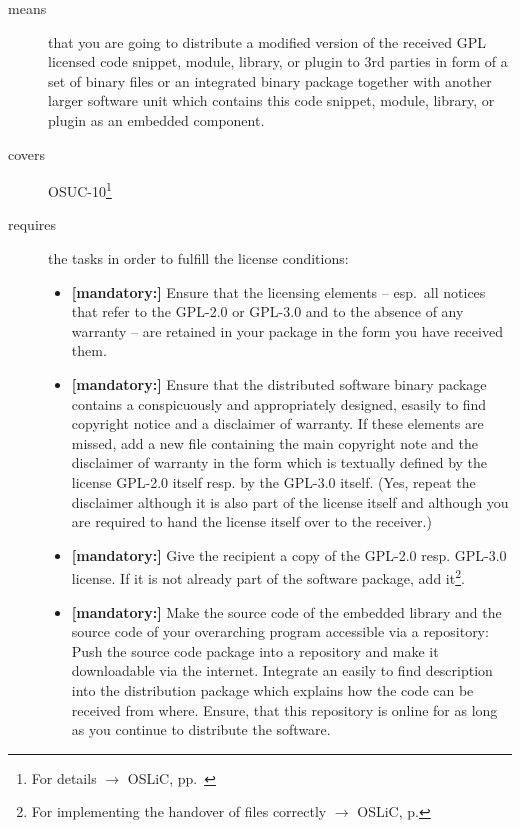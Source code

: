 \begin{description}
\item[means] that you are going to distribute a modified version of the received
GPL licensed code snippet, module, library, or plugin to 3rd parties in form
of a set of binary files or an integrated binary package together with another
larger software unit which contains this code snippet, module, library, or
plugin as an embedded component.
\item[covers] OSUC-10\footnote{For details $\rightarrow$ OSLiC, pp.\ \pageref{OSUC-10-DEF}}
\item[requires] the tasks in order to fulfill the license conditions:
\begin{itemize}
  

  \item \textbf{[mandatory:]} Ensure that the licensing elements -- esp.\ all
  notices that refer to the GPL-2.0 or GPL-3.0 and to the absence of any
  warranty -- are retained in your package in the form you have received them.

  \item \textbf{[mandatory:]} Ensure that the distributed software binary
  package contains a conspicuously and appropriately designed, esasily to find
  copyright notice and a disclaimer of warranty. If these elements are missed,
  add a new file containing the main copyright note and the disclaimer of
  warranty in the form which is textually defined by the license GPL-2.0 itself
  resp. by the GPL-3.0 itself. (Yes, repeat the disclaimer although it is also
  part of the license itself and although you are required to hand the license
  itself over to the receiver.)
  
  \item \textbf{[mandatory:]} Give the recipient a copy of the GPL-2.0 resp.
  GPL-3.0 license. If it is not already part of the software package, add
  it\footnote{For implementing the handover of files correctly $\rightarrow$
  OSLiC, p. \pageref{DistributingFilesHint}}.

  \item \textbf{[mandatory:]} Make the source code of the embedded library and
  the source code of your overarching program accessible via a repository: Push
  the source code package into a repository and make it downloadable via the
  internet. Integrate an easily to find description into the distribution
  package which explains how the code can be received from where. Ensure, that
  this repository is online for as long as you continue to distribute the
  software.


\end{itemize}
\end{description}
